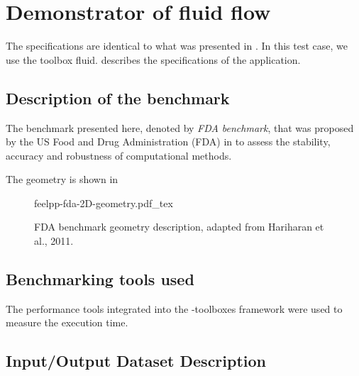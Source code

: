 
\section{Demonstrator of fluid flow}


The specifications are identical to what was presented in .
In this test case, we use the \Feelpp toolbox fluid.
 describes the specifications of the application.


\subsection{Description of the benchmark}

The benchmark presented here, denoted by \emph{FDA benchmark}, that was proposed by the US Food and Drug Administration (FDA) in \cite{hariharan_multilaboratory_2011} to assess the stability, accuracy and robustness of computational methods.

The geometry is shown in 

\begin{figure}[!ht]
  \centering
  \def\svgwidth{\textwidth}
  {feelpp-fda-2D-geometry.pdf_tex}
  \caption{FDA benchmark geometry description, adapted from Hariharan et al., 2011.}
  \label{fig:spec:app-feelpp-discr-2:fda:geometry}
\end{figure}



\subsection{Benchmarking tools used}


The performance tools integrated into the \Feelpp-toolboxes framework were used to measure the execution time.






\subsection{Input/Output Dataset Description}


